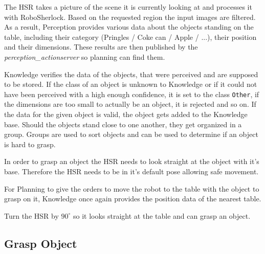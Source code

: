 \documentclass[main.tex]{subfiles}
\begin{document}
	\begin{perception}
	The HSR takes a picture of the scene it is currently looking at and processes it with RoboSherlock. Based on the requested region the input images are filtered. As a result, Perception provides various data about the objects standing on the table, including their category (Pringles / Coke can / Apple / ...), their position and their dimensions. These results are then published by the \textit{perception\_actionserver} so planning can find them.\end{perception}
	
	\begin{knowledge}
	Knowledge verifies the data of the objects, that were perceived and are supposed to be stored. If the class of an object is unknown to Knowledge or if it could not have been perceived with a high enough confidence, it is set to the class \texttt{Other}, if the dimensions are too small to actually be an object, it is rejected and so on. If the data for the given object is valid, the object gets added to the Knowledge base. Should the objects stand close to one another, they get organized in a group. Groups are used to sort objects and can be used to determine if an object is hard to grasp.
	\end{knowledge}
	
	\begin{manipulation}
	In order to grasp an object the HSR needs to look straight at the object with it's base. Therefore the HSR needs to be in it's default pose allowing safe movement.
	\end{manipulation}
	
	\begin{knowledge}
	For Planning to give the orders to move the robot to the table with the object to grasp on it, Knowledge once again provides the position data of the nearest table.
	\end{knowledge}
	
	\begin{navigation}
	Turn the HSR by $90^\circ$ so it looks straight at the table and can grasp an object.
	\end{navigation}
	
	\subsection{Grasp Object}
	
\end{document}
